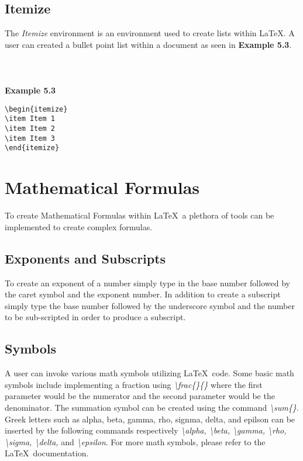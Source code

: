 \documentclass[11pt,twocolumn]{article}
\begin{document}
\subsection{Itemize}
The \textit{Itemize} environment is an environment used to create lists within \LaTeX. A user can created a bullet point list within a document as seen in \textbf{Example 5.3}.\\
\\
\\
\\
\noindent \textbf{Example 5.3}
\begin{verbatim}
\begin{itemize}
\item Item 1
\item Item 2
\item Item 3
\end{itemize}
\end{verbatim}

\section{Mathematical Formulas}
To create Mathematical Formulas within \LaTeX\, a plethora of tools can be implemented to create complex formulas.

\subsection{Exponents and Subscripts}
\par To create an exponent of a number simply type in the base number followed by the caret symbol and the exponent number. In addition to create a subscript simply type the base number followed by the underscore symbol and the number to be sub-scripted in order to produce a subscript. 

\subsection{Symbols}
A user can invoke various math symbols utilizing \LaTeX\ code. Some basic math symbols include implementing a fraction using \textit{\textbackslash frac\{\}\{\}} where the first parameter would be the numerator and the second parameter would be the denominator. The summation symbol can be created using the command \textit{\textbackslash sum\{\}}. Greek letters such as alpha, beta, gamma, rho, signma, delta, and epilson can be inserted by the following commands respectively \textit{\textbackslash alpha, \textbackslash beta, \textbackslash gamma, \textbackslash rho, \textbackslash sigma, \textbackslash delta,} and \textit{\textbackslash epsilon}. For more math symbols, please refer to the \LaTeX\ documentation.
\end{document}
